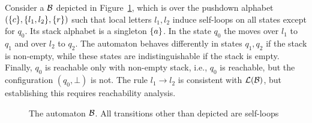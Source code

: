 \begin{example}
Consider a \DVPA $\mathcal{B}$ depicted in Figure~\ref{fig:nonsyntactic}, which is over the pushdown alphabet $(\{c\},\{l_1, l_2\}, \{r\})$ such that local letters $l_1, l_2$ induce self-loops on 
all states except for $q_0$. Its stack alphabet is a singleton $\{a\}$.
In the state $q_0$ the \DVPA moves over $l_1$ to $q_1$ and over $l_2$ to $q_2$. The automaton behaves differently in states $q_1, q_2$ if the stack is non-empty, while these states are indistinguishable 
if the stack is empty. 
Finally, $q_0$ is reachable only with non-empty stack, i.e., $q_0$ is reachable, but the configuration $(q_0, \bot)$ is not.
The rule $l_1 \to l_2$ is consistent with $\mathcal{L}(\mathcal{B})$, but establishing this requires reachability analysis. 
\begin{figure}
\centering
{}
\caption{The automaton $\mathcal{B}$. All transitions other than depicted are self-loops}
\label{fig:nonsyntactic}
\end{figure}
\end{example} 


